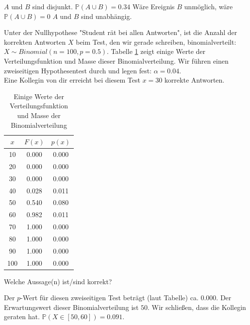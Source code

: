 \documentclass[10pt,addpoints,answers]{exam}
\begin{document}
\begin{questions}
\begin{choices}
\choice $A$ und $B$ sind disjunkt.
\choice $\mathbb{P}(A \cup B) = 0.34$
\choice Wäre Ereignis $B$ unmöglich, wäre $\mathbb{P}(A \cup B) = 0$
\choice $A$ und $B$ sind unabhängig.
\end{choices}

\question Unter der Nullhypothese "Student rät bei allen Antworten", ist die Anzahl der korrekten Antworten $X$
beim Test, den wir gerade schreiben, binomialverteilt: $X \sim Binomial(n=100, p=0.5)$.
Tabelle \ref{tab:binomialwerte} zeigt einige Werte der
Verteilungsfunktion und Masse dieser Binomialverteilung. 
Wir führen einen zweiseitigen Hypothesentest durch und legen fest: $\alpha = 0.04$.\\
Eine Kollegin von dir erreicht bei diesem Test $x=30$ korrekte Antworten.
\\
\begin{table}[h!]
    \centering
    \caption{Einige Werte der Verteilungsfunktion und Masse der Binomialverteilung}
    \label{tab:binomialwerte}
    \begin{tabular}{|c|c|c|}
    \hline
    $x$ & $F(x)$ & $p(x)$ \\
    \hline
    10  & 0.000 & 0.000 \\
    20  & 0.000 & 0.000 \\
    30  & 0.000 & 0.000 \\
    40  & 0.028 & 0.011 \\
    50  & 0.540 & 0.080 \\
    60  & 0.982 & 0.011 \\
    70  & 1.000 & 0.000 \\
    80  & 1.000 & 0.000 \\
    90  & 1.000 & 0.000 \\
    100 & 1.000 & 0.000 \\
    \hline
    \end{tabular}
    \end{table}

Welche Aussage(n) ist/sind korrekt?
\\
\begin{choices}
\CorrectChoice Der $p$-Wert für diesen zweiseitigen Test beträgt (laut Tabelle) ca. $0.000$.
\CorrectChoice Der Erwartungswert dieser Binomialverteilung ist $50$.
\choice Wir schließen, dass die Kollegin geraten hat.
\choice $\mathbb{P}(X \in [50, 60]) = 0.091$.
\end{choices}


\end{questions}
\end{document}
